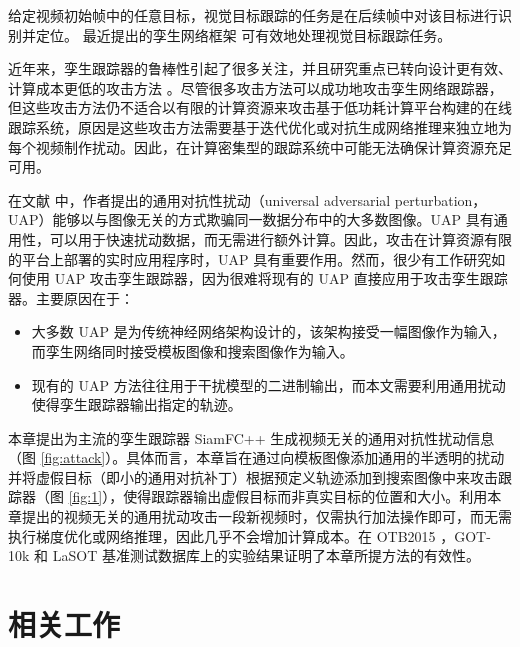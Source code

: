 给定视频初始帧中的任意目标，视觉目标跟踪的任务是在后续帧中对该目标进行识别并定位。
最近提出的孪生网络框架 \cite{SiamFC,SiamRPN,SiamRPN++,SiamFC++} 可有效地处理视觉目标跟踪任务。

近年来，孪生跟踪器的鲁棒性引起了很多关注，并且研究重点已转向设计更有效、计算成本更低的攻击方法 \cite{TTP,FAN,SPARK}。尽管很多攻击方法可以成功地攻击孪生网络跟踪器，但这些攻击方法仍不适合以有限的计算资源来攻击基于低功耗计算平台构建的在线跟踪系统，原因是这些攻击方法需要基于迭代优化或对抗生成网络推理来独立地为每个视频制作扰动。因此，在计算密集型的跟踪系统中可能无法确保计算资源充足可用。

在文献 \cite{UAP} 中，作者提出的通用对抗性扰动（universal adversarial perturbation，UAP）能够以与图像无关的方式欺骗同一数据分布中的大多数图像。UAP 具有通用性，可以用于快速扰动数据，而无需进行额外计算。因此，攻击在计算资源有限的平台上部署的实时应用程序时，UAP 具有重要作用。然而，很少有工作研究如何使用 UAP 攻击孪生跟踪器，因为很难将现有的 UAP 直接应用于攻击孪生跟踪器。主要原因在于：
\begin{itemize}
\item 大多数 UAP 是为传统神经网络架构设计的，该架构接受一幅图像作为输入，而孪生网络同时接受模板图像和搜索图像作为输入。
\item 现有的 UAP 方法往往用于干扰模型的二进制输出，而本文需要利用通用扰动使得孪生跟踪器输出指定的轨迹。
\end{itemize}

本章提出为主流的孪生跟踪器 SiamFC++ \cite{SiamFC++} 生成视频无关的通用对抗性扰动信息（图 \ref{fig:attack}）。具体而言，本章旨在通过向模板图像添加通用的半透明的扰动并将虚假目标（即小的通用对抗补丁）根据预定义轨迹添加到搜索图像中来攻击跟踪器（图 \ref{fig:1}），使得跟踪器输出虚假目标而非真实目标的位置和大小。利用本章提出的视频无关的通用扰动攻击一段新视频时，仅需执行加法操作即可，而无需执行梯度优化或网络推理，因此几乎不会增加计算成本。在 OTB2015 \cite{OTB2015}，GOT-10k \cite{GOT-10k} 和 LaSOT \cite{LaSOT} 基准测试数据库上的实验结果证明了本章所提方法的有效性。
\section{相关工作}

